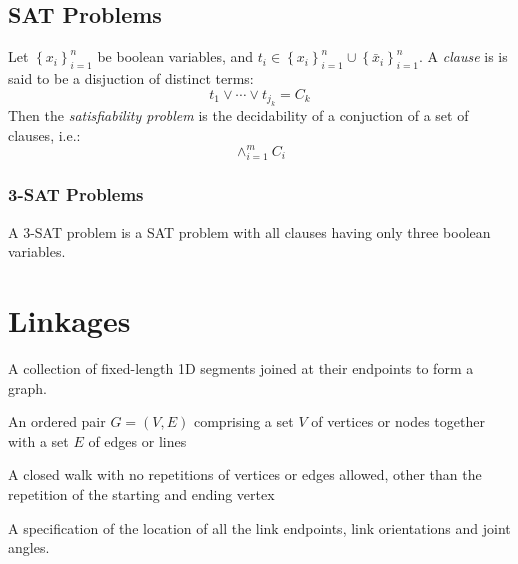\subsection{SAT Problems}

\begin{prob}\label{prob:ncpi-6}%
Let $\left\lbrace x_i \right\rbrace_{i=1}^{n} $ be boolean variables, and $t_i \in \left\lbrace x_i\right\rbrace_{i=1}^{n}  \cup \left\lbrace \bar{x}_i\right\rbrace_{i=1}^{n}   $.  A \textit{clause} is is said to be a disjuction of distinct terms:
$$
t_1 \vee \cdots \vee t_{j_k} = C_k
$$
Then the \textit{satisfiability problem} is the decidability of a conjuction of a set of clauses, i.e.:
$$ \wedge_{i=1}^m C_i$$
\end{prob} 
\subsubsection{3-SAT Problems}
A 3-SAT problem is a SAT problem with all clauses having only three boolean variables. 
\section{Linkages}
\begin{definition}[Linkage]\label{def:linkages-1}
A collection of fixed-length 1D segments joined at their endpoints to form a graph.
\end{definition} 
\begin{definition}[Graph]\label{def:linkages-2}
An ordered pair $G = (V, E)$ comprising a set $V$ of vertices or nodes together with a set $E$ of edges or lines
\end{definition} 
\begin{definition}[Cycle]\label{def:linkages-3}
 A closed walk with no repetitions of vertices or edges allowed, other than the repetition of the starting and ending vertex
\end{definition} 
\begin{definition}[Configuration]\label{def:linkages-6}
A specification of the location of all the link endpoints, link orientations and joint angles.
\end{definition} 

